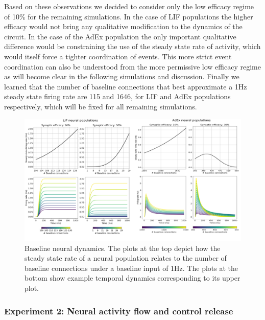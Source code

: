 \documentclass[10pt]{article}
\begin{document}
Based on these observations we decided to consider only the low efficacy regime of 10\% for the remaining simulations.
In the case of LIF populations the higher efficacy would not bring any qualitative modification to the dynamics of the circuit.
In the case of the AdEx population the only important qualitative difference would be constraining the use of the steady state rate of activity, which would itself force a tighter coordination of events.
This more strict event coordination can also be understood from the more permissive low efficacy regime as will become clear in the following simulations and discussion.
Finally we learned that the number of baseline connections that best approximate a 1Hz steady state firing rate are 115 and 1646, for LIF and AdEx populations respectively, which will be fixed for all remaining simulations.

\begin{figure}[h!]
  \begin{center}
    \includegraphics[width=1.00\columnwidth]{figures/experiment_001/experiment_001}
    \caption{Baseline neural dynamics.
      The plots at the top depict how the steady state rate of a neural population relates to the number of baseline connections under a baseline input of 1Hz.
      The plots at the bottom show example temporal dynamics corresponding to its upper plot.}
    \label{674368}

  \end{center}
\end{figure}

\subsubsection{Experiment 2: Neural activity flow and control
  release}\label{experiment-2-neural-activity-flow-and-control-release}
\end{document}
